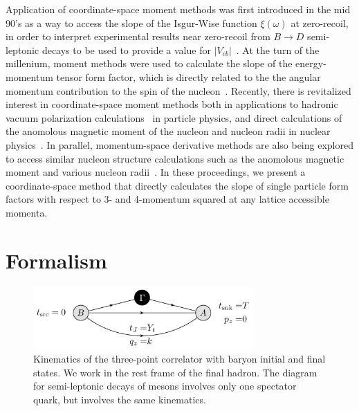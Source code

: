 \documentclass{PoS}
\begin{document}
Application of coordinate-space moment methods was first introduced in the mid 90's as a way to access the slope of the Isgur-Wise function $\xi(\omega)$ at zero-recoil, in order to interpret experimental results near zero-recoil from $B\rightarrow D$ semi-leptonic decays to be used to provide a value for $|V_{cb}|$~\cite{Lellouch:1994zu}. At the turn of the millenium, moment methods were used to calculate the slope of the energy-momentum tensor form factor, which is directly related to the the angular momentum contribution to the spin of the nucleon~\cite{Mathur:1999uf}\cite{Gadiyak:2001fe}. Recently, there is revitalized interest in coordinate-space moment methods both in applications to hadronic vacuum polarization calculations~\cite{Chakraborty:2016mwy}\cite{Blum:2016xpd} in particle physics, and direct calculations of the anomolous magnetic moment of the nucleon and nucleon radii in nuclear physics~\cite{Alexandrou:2016rbj}. In parallel, momentum-space derivative methods are also being explored to access similar nucleon structure calculations such as the anomolous magnetic moment and various nucleon radii~\cite{deDivitiis:2012vs}\cite{Tiburzi:2014yra}.  In these proceedings, we present a coordinate-space method that directly calculates the slope of single particle form factors with respect to 3- and 4-momentum squared at any lattice accessible momenta.

\section{Formalism}


\begin{figure}[h]
	\centering
		\includegraphics[width=0.75\textwidth]{./3pt_kinematics.pdf}
	\caption{Kinematics of the three-point correlator with baryon initial and final states. We work in the rest frame of the final hadron. The diagram for semi-leptonic decays of mesons involves only one spectator quark, but involves the same kinematics.}
	\label{fig:3pt_kinematics}
\end{figure}
\end{document}
